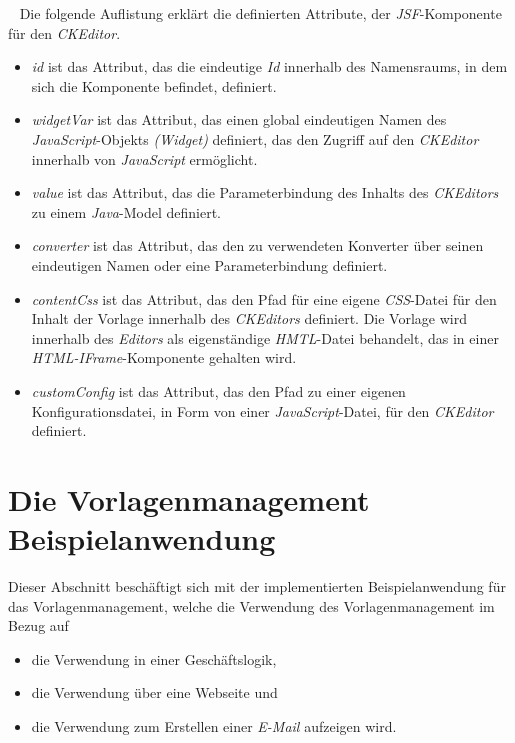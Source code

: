\ \newline
Die folgende Auflistung erklärt die definierten Attribute, der \emph{JSF}-Komponente für den \emph{CKEditor}.
\begin{itemize}
	\item\emph{id} 
	\newline
	ist das Attribut, das die eindeutige \emph{Id} innerhalb des Namensraums, in dem sich die Komponente befindet, definiert.
	\item\emph{widgetVar}
	\newline
	ist das Attribut, das einen global eindeutigen Namen des \emph{JavaScript}-Objekts \emph{(Widget)} definiert, das den Zugriff auf den \emph{CKEditor} innerhalb von \emph{JavaScript} ermöglicht.
	\item\emph{value}
	\newline
	ist das Attribut, das die Parameterbindung des Inhalts des \emph{CKEditors} zu einem \emph{Java}-Model definiert.
	\item\emph{converter}
	\newline
	ist das Attribut, das den zu verwendeten Konverter über seinen eindeutigen Namen oder eine Parameterbindung definiert.
	\item\emph{contentCss}
	\newline
	ist das Attribut, das den Pfad für eine eigene \emph{CSS}-Datei für den Inhalt der Vorlage innerhalb des \emph{CKEditors} definiert. Die Vorlage wird innerhalb des \emph{Editors} als eigenständige \emph{HMTL}-Datei behandelt, das in einer \emph{HTML-IFrame}-Komponente gehalten wird.
	\item\emph{customConfig}
	\newline
	ist das Attribut, das den Pfad zu einer eigenen Konfigurationsdatei, in Form von einer \emph{JavaScript}-Datei, für den \emph{CKEditor} definiert.
\end{itemize}

\section{Die Vorlagenmanagement Beispielanwendung}
Dieser Abschnitt beschäftigt sich mit der implementierten Beispielanwendung für das Vorlagenmanagement, welche die Verwendung des Vorlagenmanagement im Bezug auf 
\begin{itemize}
	\item die Verwendung in einer Geschäftslogik,
	\item die Verwendung über eine Webseite und
	\item die Verwendung zum Erstellen einer \emph{E-Mail} aufzeigen wird. 
\end{itemize}

